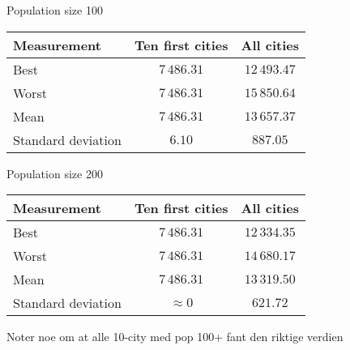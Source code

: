 \documentclass{article}
\begin{document}
Population size 100

\begin{center}
\begin{tabular}{lcc}
\toprule
Measurement & Ten first cities & All cities \\
\midrule
Best & $7\,486.31$ & $12\,493.47$ \\
Worst & $7\,486.31$ & $15\,850.64$ \\
Mean & $7\,486.31$ & $13\,657.37$ \\
Standard deviation & $6.10$ & $887.05$ \\
\bottomrule
\end{tabular}
\end{center}

Population size 200

\begin{center}
\begin{tabular}{lcc}
\toprule
Measurement & Ten first cities & All cities \\
\midrule
Best & $7\,486.31$ & $12\,334.35$ \\
Worst & $7\,486.31$ & $14\,680.17$ \\
Mean & $7\,486.31$ & $13\,319.50$ \\
Standard deviation & $\approx 0$ & $621.72$ \\
\bottomrule
\end{tabular}
\end{center}

Noter noe om at alle 10-city med pop 100+ fant den riktige verdien
\end{document}

